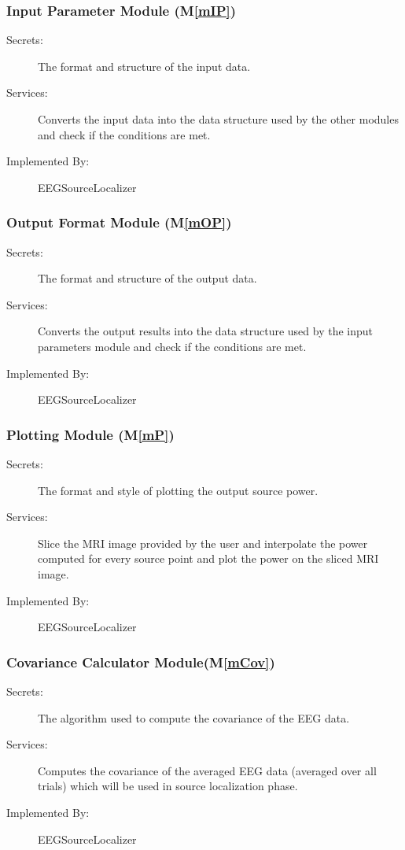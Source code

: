 \documentclass[12pt, titlepage]{article}
\newcommand{\mref}[1]{M\ref{#1}}
\renewcommand{\progname}{EEGSourceLocalizer}
\begin{document}
\subsubsection{Input Parameter Module (\mref{mIP})}

\begin{description}
\item[Secrets:]The format and structure of the input data.
\item[Services:]Converts the input data into the data structure used by the
other modules and check if the conditions are met.
\item[Implemented By:] \progname{}
\end{description}

\subsubsection{Output Format Module (\mref{mOP})}

\begin{description}
\item[Secrets:]The format and structure of the output data.
\item[Services:]Converts the output results into the data structure used by the
  input parameters module and check if the conditions are met.
\item[Implemented By:] \progname{}
\end{description}


\subsubsection{Plotting Module (\mref{mP})}

\begin{description}
\item[Secrets:]The format and style of plotting the output source power.
\item[Services:] Slice the MRI image provided by the user and interpolate the power computed for every source point and plot the power on the sliced MRI image.
\item[Implemented By:] \progname{}
\end{description}

\subsubsection{Covariance Calculator Module(\mref{mCov})}

\begin{description}
\item[Secrets:]The algorithm used to compute the covariance of the EEG data.
\item[Services:] Computes the covariance of the averaged EEG data (averaged over all trials) which will be used in source localization phase.
\item[Implemented By:] \progname{}
\end{description}
\end{document}
